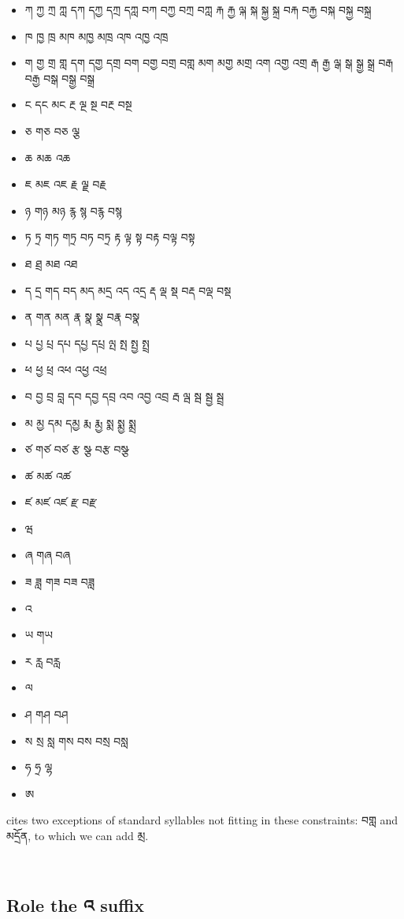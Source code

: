 \documentclass[%
a4paper,%
pagesize,%
12pt,%
parskip=off,%
bibliography=totoc,%
numbers=noenddot,%
DIV=12,%
twoside=semi,%
headings=normal%
]{scrartcl}
\begin{document}
\begin{itemize}
\item ཀ ཀྱ ཀྲ ཀླ དཀ དཀྱ དཀྲ དཀླ བཀ བཀྱ བཀྲ བཀླ རྐ རྐྱ ལྐ སྐ སྐྱ སྐྲ བརྐ བརྐྱ བསྐ བསྐྱ བསྐྲ
\item ཁ ཁྱ ཁྲ མཁ མཁྱ མཁྲ འཁ འཁྱ འཁྲ
\item ག གྱ གྲ གླ དག དགྱ དགྲ བག བགྱ བགྲ བགླ མག མགྱ མགྲ འག འགྱ འགྲ རྒ རྒྱ ལྒ སྒ སྒྱ སྒྲ བརྒ བརྒྱ བསྒ བསྒྱ བསྒྲ
\item ང དང མང རྔ ལྔ སྔ བརྔ བསྔ
\item ཅ གཅ བཅ ལྕ
\item ཆ མཆ འཆ
\item ཇ མཇ འཇ རྗ ལྗ བརྗ
\item ཉ གཉ མཉ རྙ སྙ བརྙ བསྙ
\item ཏ ཏྲ གཏ གཏྲ བཏ བཏྲ རྟ ལྟ སྟ བརྟ བལྟ བསྟ
\item ཐ ཐྲ མཐ འཐ
\item ད དྲ གད བད མད མདྲ འད འདྲ རྡ ལྡ སྡ བརྡ བལྡ བསྡ
\item ན གན མན རྣ སྣ སྣྲ བརྣ བསྣ
\item པ པྱ པྲ དཔ དཔྱ དཔྲ ལྤ སྤ སྤྱ སྤྲ
\item ཕ ཕྱ ཕྲ འཕ འཕྱ འཕྲ
\item བ བྱ བྲ བླ དབ དབྱ དབྲ འབ འབྱ འབྲ རྦ ལྦ སྦ སྦྱ སྦྲ
\item མ མྱ དམ དམྱ རྨ རྨྱ སྨ སྨྱ སྨྲ
\item ཙ གཙ བཙ རྩ སྩ བརྩ བསྩ
\item ཚ མཚ འཚ
\item ཛ མཛ འཛ རྫ བརྫ
\item ཝ
\item ཞ གཞ བཞ
\item ཟ ཟླ གཟ བཟ བཟླ
\item འ
\item ཡ གཡ
\item ར རླ བརླ
\item ལ
\item ཤ གཤ བཤ
\item ས སྲ སླ གས བས བསྲ བསླ
\item ཧ ཧྲ ལྷ
\item ཨ
\end{itemize}

\cite{TsheshabGrammarTopics} cites two exceptions of standard syllables not fitting in these constraints: བགླ and མདྲོན, to which we can add མྲ.

­\subsection{Role the འ suffix}
\end{document}

